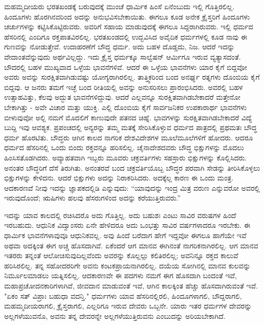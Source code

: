 ಮಹಮ್ಮದೀಯರು ಭರತಖಂಡಕ್ಕೆ ಬರುವುದಕ್ಕೆ ಮುಂಚೆ ಧಾರ್ಮಿಕ ಹಿಂಸೆ ಏನೆಂಬುದು ಇಲ್ಲಿ ಗೊತ್ತಿರಲಿಲ್ಲ. ಹಿಂದೂಗಳು ಹೊರಗಿನವರಿಂದ ಅದನ್ನು ಅನುಭವಿಸಬೇಕಾಯಿತು. ಈಗಲೂ ಕೂಡ ಅನೇಕ ಕ್ರೈಸ್ತರಿಗೆ ಹಿಂದೂಗಳು ಚರ್ಚುಗಳನ್ನು ಕಟ್ಟಿಸಿಕೊಟ್ಟಿರುವರು. ಅವರಿಗೆ ಸಹಾಯ ಮಾಡುವುದಕ್ಕೆ ಈಗಲೂ ಸಿದ್ದರಾಗಿರುವರು. ಇಲ್ಲಿ ಧರ್ಮದ ಹೆಸರಿನಲ್ಲಿ ಎಂದಿಗೂ ರಕ್ತಪಾತವಿರಲಿಲ್ಲ. ಭರತಖಂಡದಲ್ಲಿ ಉದ್ಭವಿಸಿದ ಅವೈದಿಕ ಧರ್ಮಗಳಲ್ಲಿ ಕೂಡ ನಾವು ಈ ಗುಣವನ್ನು ನೋಡುತ್ತೇವೆ. ಉದಾಹರಣೆಗೆ ಬೌದ್ಧ ಧರ್ಮ. ಅದು ಬಹಳ ದೊಡ್ಡದು, ನಿಜ. ಆದರೆ ಇದನ್ನು ವೇದಾಂತವೆನ್ನುವುದು ಅರ್ಥವಿಲ್ಲದ್ದು. ಇದು ಕ್ರೈಸ್ತ ಧರ್ಮಕ್ಕೂ ಸಾಲ್ವೆಷನ್ ಆರ್ಮಿಗೂ ಇರುವ ವ್ಯತ್ಯಾಸದಂತೆ. ಬೌದರಲ್ಲಿ ಬಹಳ ಮುಖ್ಯವಾದ ಒಳ್ಳೆಯ ಭಾವನೆಗಳಿವೆ. ಆದರೆ ಈ ಒಳ್ಳೆಯ ಭಾವನೆಗಳು ಯಾರ ಕೈಗೆ ಬಿದ್ದವೋ ಅವರು ಅವನ್ನು ಸುರಕ್ಷಿತವಾಗಿಡುವಷ್ಟು ಯೋಗ್ಯರಾಗಿರಲಿಲ್ಲ. ತಾತ್ತ್ವಿಕರಿಂದ ಬಂದ ಅನರ್ಘ್ಯ ರತ್ನಗಳು ದೊಂಬಿಯ ಕೈಗೆ ಬಿದ್ದವು. ಆ ಜನರು ತಮಗೆ ಇಚ್ಛೆ ಬಂದ ರೀತಿಯಲ್ಲಿ ಅವನ್ನು ಅನುಸರಿಸಲು ಪ್ರಾರಂಭಿಸಿದರು. ಅವರಲ್ಲಿ ಬಹಳ ಉತ್ಸಾಹವಿತ್ತು, ಕೆಲವು ಅದ್ಭುತ ಭಾವನೆಗಳಿದ್ದುವು. ಆದರೆ ಎಲ್ಲವನ್ನೂ ಸುರಕ್ಷಿತವಾಗಿಡಬೇಕಾದರೆ ಮತ್ತೇನೋ ಬೇಕಾಗಿತ್ತು - ಅವೇ ವಿಚಾರ ಮತ್ತು ಯುಕ್ತಿ. ಎಲ್ಲಿ ದೊಂಬಿಯ ಕೈಗೆ ಸಾರ್ವಜನಿಕರ ಉಪಕಾರಾರ್ಥ ಭಾವನೆಗಳು ಬೀಳುವುವೋ ಅಲ್ಲಿ ನಮಗೆ ಮೊದಲಿಗೆ ಕಾಣುವುದೇ ಪತನದ ಚಿಹ್ನೆ. ಭಾವಗಳನ್ನು ಸುರಕ್ಷಿತವಾಗಿಡಬೇಕಾದರೆ ವಿದ್ಯೆ ಬುದ್ದಿ ಇವು ಆವಶ್ಯಕ. ಪ್ರಪಂಚದಲ್ಲಿ ಅನ್ಯರನ್ನು ತಮ್ಮ ಮತಕ್ಕೆ ಸೇರಿಸಿಕೊಳ್ಳುವ ಧರ್ಮದ ಪಾತ್ರದಲ್ಲಿ ಪ್ರಥಮತಃ ಬೌದ್ಧ ಧರ್ಮ ಹೊರಟಿತು. ಬೌದ್ಧರು ಆಗಿನ ಕಾಲದ ನಾಗರಿಕ ದೇಶವಿದೇಶಗಳ ಮೂಲೆಮೂಲೆಗಳಿಗೆ ಹೋದರು. ಆದರೂ ಧರ್ಮದ ಹೆಸರಿನಲ್ಲಿ ಒಂದು ಬಿಂದು ರಕ್ತವನ್ನೂ ಹರಿಸಲಿಲ್ಲ. ಚೈನಾದೇಶದವರು ಬೌದ್ಧ ಭಿಕ್ಷುಗಳನ್ನು ಮೊದಲು ಹಿಂಸಿಸತೊಡಗಿದರು. ಅವ್ಯಾಹತವಾಗಿ ಇಬ್ಬರು ಮೂವರು ಚಕ್ರವರ್ತಿಗಳು ಸಹಸ್ರಾರು ಭಿಕ್ಷುಗಳನ್ನು ಕೊಲ್ಲಿಸಿದರು. ಅನಂತರ ಬೌದ್ಧರಿಗೆ ದೆಸೆ ತಿರುಗಿತು. ಅನಂತರವೆ ಬಂದ ಚಕ್ರವರ್ತಿಯೊಬ್ಬ ಬೌದ್ಧರ ಪರವಾಗಿ ಸೇಡನ್ನು ತೀರಿಸಿಕೊಳ್ಳಲು ಭಿಕ್ಷುಗಳನ್ನು ಕೇಳಿದನು. ಆದರೆ ಭಿಕ್ಷುಗಳು ಅದನ್ನು ನಿರಾಕರಿಸಿದರು. ಅದಕ್ಕೆಲ್ಲ ಕಾರಣ ಈ ಒಂದು ಮಂತ್ರ. ಆದಕಾರಣವೆ ನೀವು ಇದನ್ನು ಜ್ಞಾಪಕದಲ್ಲಿಡಿ ಎನ್ನುವುದು: “ಯಾವುದನ್ನು ಇಂದ್ರ ಮಿತ್ರ ವರುಣ ಎನ್ನುವರೋ ಅವರಲ್ಲಿ ಇರುವುದೊಂದೆ; ಋಷಿಗಳು ಹಲವು ಹೆಸರುಗಳಿಂದ ಅದನ್ನು ಕರೆಯುತ್ತಿರುವರು.”

ಇದನ್ನು ಯಾವ ಕಾಲದಲ್ಲಿ ರಚಿಸಿದರೊ ಅದು ಗೊತ್ತಿಲ್ಲ. ಅದು ಬಹುಶಃ ಎಂಟು ಸಾವಿರ ವರುಷಗಳ ಹಿಂದೆ ಇರಬಹುದು. ಆಧುನಿಕ ವಿದ್ವಾಂಸರು ಏನೇ ಹೇಳಿದರೂ ಅದು ಒಂಭತ್ತು ಸಾವಿರ ವರ್ಷಗಳಾದರೂ ಇರಬೇಕು. ಈ ಧಾರ್ಮಿಕ ಭಾವನೆಗಳಾವುವೂ ಆಧುನಿಕವಲ್ಲ. ಅವು ಹಿಂದೆ ಬರೆದಾಗ ಹೇಗೆ ಇದ್ದವೋ ಈಗಲೂ ಹಾಗೆಯೇ ಇವೆ ಅಥವಾ ಅದಕ್ಕಿಂತ ಈಗ ಅಚ್ಚ ಹೊಸದಾಗಿವೆ. ಏಕೆಂದರೆ ಆಗ ಮಾನವ ಈಗಿನಂತೆ ನಾಗರಿಕನಾಗಿರಲಿಲ್ಲ. ಆಗ ಮಾನವ ಇತರರು ತನ್ನಂತೆ ಆಲೋಚಿಸುವುದಿಲ್ಲವೆಂದು ಅವರನ್ನು ಕೊಲ್ಲಲ್ಲು ಕಲಿತಿರಲಿಲ್ಲ; ಅವನಿನ್ನೂ ರಕ್ತದ ಕಾಲುವೆ ಹರಿಸಿರಲಿಲ್ಲ. ತನ್ನ ಸಹೋದರರಿಗೇ ಅವನು ಕಂಟಕಪ್ರಾಯನಾಗಿರಲಿಲ್ಲ. ದಯೆಯ ಸೋಗಿನಲ್ಲಿ ಮಾನವ ಕುಲವನ್ನು ನಿರ್ಮೂಲಮಾಡಲು ಯತ್ನಿಸಲಿಲ್ಲ. ಆದಕಾರಣವೇ ಈ ಪದಗಳು ನಮಗೆ ಈಗ ಹೊಸದಾಗಿ ಬಂದಂತೆ ಇವೆ, ಮಹಾಪ್ರಚೋದನಕಾರಿಗಳಾಗಿವೆ, ಜೀವದಾನ ಮಾಡುವಂತೆ ಇವೆ, ಆಗಿನ ಕಾಲಕ್ಕಿಂತ ಹೆಚ್ಚು ಹೊಸದಾಗಿರುವಂತೆ ಇವೆ. "ಏಕಂ ಸತ್ ವಿಪ್ರಾಃ ಬಹುಧಾ ವದನ್ತಿ." ಧರ್ಮಗಳು ಯಾವ ಹೆಸರಿನಲ್ಲಿರಲಿ, ಹಿಂದೂಗಳಾಗಲಿ, ಬೌದ್ದರಾಗಲಿ, ಮಹಮ್ಮದೀಯರಾಗಲಿ, ಕ್ರೈಸ್ತರಾಗಲಿ, ಎಲ್ಲರಿಗೂ ಇರುವ ದೇವರು ಒಬ್ಬನೇ. ಯಾರು ಇತರ ಧರ್ಮಗಳ ದೇವರನ್ನು ಅಲ್ಲಗಳೆಯುವನೊ, ಅವನು ತನ್ನ ದೇವರನ್ನೇ ಅಲ್ಲಗಳೆಯುತ್ತಿರುವನು ಎಂಬುದನ್ನು ಅರಿಯಬೇಕಾಗಿದೆ.

